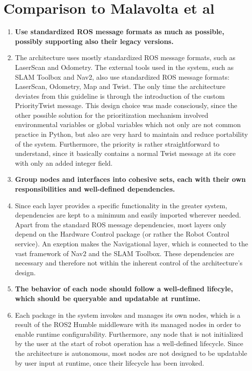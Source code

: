 \documentclass[%
paper=A4,               %
twoside=true,           %
openright,              %
11pt,                   %
bibliography=totoc,     %
titlepage=on,           %
DIV=12,                 %
BCOR=1.5cm,             %
parskip=half,            %
final
]{scrreprt}
\begin{document}
	\section{Comparison to Malavolta et al}
	\label{sec:ComparisonMalavolta}
	
	\begin{enumerate}[leftmargin=9mm, align=left]
		\item \textbf{Use standardized ROS message formats as much as possible, possibly supporting also their legacy versions.} 
		\item[]The architecture uses mostly standardized ROS message formats, such as LaserScan and Odometry. The external tools used in the system, such as SLAM Toolbox and Nav2, also use standardized ROS message formats: LaserScan, Odometry, Map and Twist. The only time the architecture deviates from this guideline is through the introduction of the custom PriorityTwist message. This design choice was made consciously, since the other possible solution for the prioritization mechanism involved environmental variables or global variables which not only are not common practice in Python, but also are very hard to maintain and reduce portability of the system. Furthermore, the priority is rather straightforward to understand, since it basically contains a normal Twist message at its core with only an added integer field.
		
		\item \textbf{Group nodes and interfaces into cohesive sets, each with their own responsibilities and well-defined dependencies.} 
		\item[]Since each layer provides a specific functionality in the greater system, dependencies are kept to a minimum and easily imported wherever needed. Apart from the standard ROS message dependencies, most layers only depend on the Hardware Control package (or rather the Robot Control service). An exeption makes the Navigational layer, which is connected to the vast framework of Nav2 and the SLAM Toolbox. These dependencies are necessary and therefore not within the inherent control of the architecture's design.
		
		\item \textbf{The behavior of each node should follow a well-defined lifecyle, which should be queryable and updatable at runtime.} 
		\item[]
		Each package in the system invokes and manages its own nodes, which is a result of the ROS2 Humble middleware with its managed nodes in order to enable runtime configurability. Furthermore, any node that is not initialized by the user at the start of robot operation has a well-defined lifecycle. Since the architecture is autonomous, most nodes are not designed to be updatable by user input at runtime, once their lifecycle has been invoked. 
		

\end{enumerate}
\end{document}
